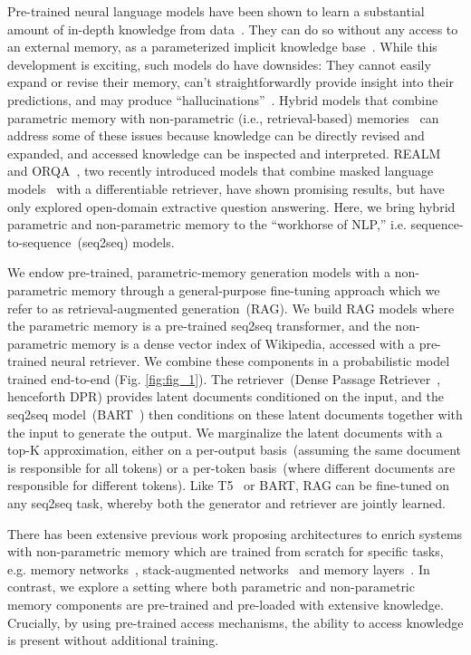 Pre-trained neural language models have been shown to learn a substantial amount of in-depth knowledge from data~\cite{petroni-etal-2019-language}. 
They can do so without any access to an external memory, as a parameterized implicit knowledge base~\cite{raffel2019t5,roberts2020t5cqba}. 
While this development is exciting, such models do have downsides: 
They cannot easily expand or revise their memory, can't straightforwardly provide insight into their predictions, and may produce ``hallucinations''~\cite{marcus2020next}.
Hybrid models that combine parametric memory with non-parametric (i.e., retrieval-based) memories~\cite{guu2020realm,Karpukhin20dense,petroni2020how} can address some of these issues because knowledge 
can be directly revised and expanded, and accessed knowledge can be inspected and interpreted. 
REALM~\cite{guu2020realm} and ORQA~\cite{lee-etal-2019-latent}, two recently introduced models that combine masked language models~\cite{devlin_bert:_2019} with a differentiable retriever, have shown promising results, but have only explored open-domain extractive question answering. 
Here, we bring hybrid parametric and non-parametric memory to the ``workhorse of NLP,'' i.e. sequence-to-sequence~(seq2seq) models.

We endow pre-trained, parametric-memory generation models with a non-parametric memory through a general-purpose fine-tuning approach which we refer to as retrieval-augmented generation~(RAG).
We build RAG models where the parametric memory is a pre-trained seq2seq transformer, and the non-parametric memory is a dense vector index of Wikipedia, accessed with a pre-trained neural retriever. We combine these components in a probabilistic model trained end-to-end (Fig. \ref{fig:fig_1}). The retriever~(Dense Passage Retriever~\cite{Karpukhin20dense}, henceforth DPR) provides latent documents conditioned on the input, and the seq2seq model~(BART~\cite{lewis2019bart}) then conditions on these latent documents together with the input to generate the output. 
We marginalize the latent documents with a top-K approximation, either on a per-output basis~(assuming the same document is responsible for all tokens) or a per-token basis~(where different documents are responsible for different tokens). Like T5~\cite{raffel2019t5} or BART, RAG can be fine-tuned on any seq2seq task, whereby both the generator and retriever are jointly learned. 

There has been extensive previous work proposing architectures to enrich systems with non-parametric memory which are trained from scratch for specific tasks, e.g. memory networks~\cite{weston2015memory,sukhbaatar2015end}, stack-augmented networks~\cite{joulin2015} and memory layers~\cite{lample_large_2019}. In contrast, we explore a setting where both parametric and non-parametric memory components are pre-trained and pre-loaded with extensive knowledge. Crucially, by using pre-trained access mechanisms, the ability to access knowledge is present without additional training. 

